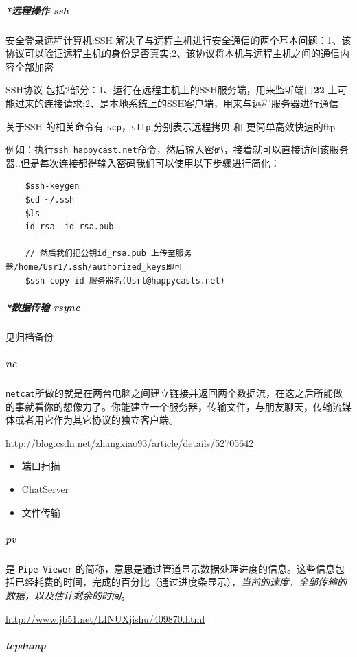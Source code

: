 \documentclass[UTF8,a4paper,12pt]{ctexbook}
\begin{document}
			\subparagraph{*远程操作 ssh} 安全登录远程计算机:SSH 解决了与远程主机进行安全通信的两个基本问题：1、该协议可以验证远程主机的身份是否真实;2、该协议将本机与远程主机之间的通信内容全部加密
				
				SSH协议 包括2部分：1、运行在远程主机上的SSH服务端，用来监听端口\textbf{22} 上可能过来的连接请求;2、是本地系统上的SSH客户端，用来与远程服务器进行通信
				
			关于SSH 的相关命令有 \verb|scp|，\verb|sftp|,分别表示远程拷贝 和 更简单高效快速的ftp
			
			例如：执行\verb|ssh happycast.net|命令，然后输入密码，接着就可以直接访问该服务器..但是每次连接都得输入密码我们可以使用以下步骤进行简化：
				\begin{lstlisting}
	$ssh-keygen
	$cd ~/.ssh
	$ls
	id_rsa  id_rsa.pub
	
	// 然后我们把公钥id_rsa.pub 上传至服务器/home/Usr1/.ssh/authorized_keys即可
	$ssh-copy-id 服务器名(Usrl@happycasts.net)
				\end{lstlisting}
			
			\subparagraph{*数据传输 rsync}见归档备份
			
			\subparagraph{nc}\verb|netcat|所做的就是在两台电脑之间建立链接并返回两个数据流，在这之后所能做的事就看你的想像力了。你能建立一个服务器，传输文件，与朋友聊天，传输流媒体或者用它作为其它协议的独立客户端。
				
				\url{http://blog.csdn.net/zhangxiao93/article/details/52705642}
				\begin{itemize}[itemindent = 1em]
					\item 端口扫描
					\item ChatServer
					\item 文件传输
				\end{itemize}
				
			\subparagraph{pv}是 \verb|Pipe Viewer| 的简称，意思是通过管道显示数据处理进度的信息。这些信息包括已经耗费的时间，完成的百分比（通过进度条显示），\textit{当前的速度，全部传输的数据，以及估计剩余的时间}。
			
				\url{http://www.jb51.net/LINUXjishu/409870.html}
				
			\subparagraph{tcpdump}
				
\end{document}
